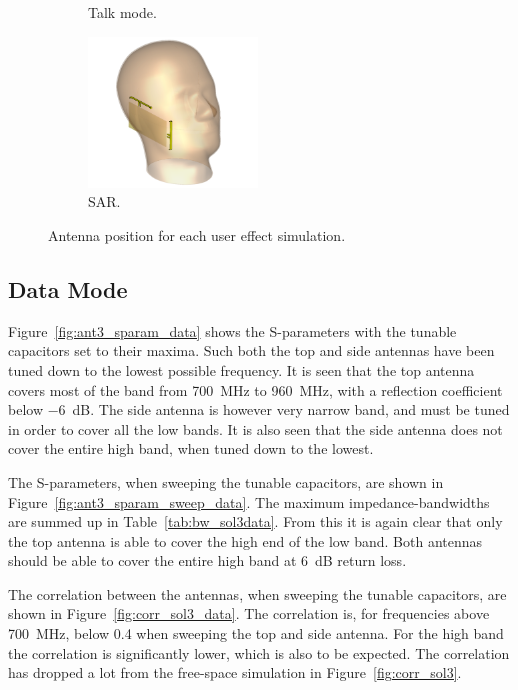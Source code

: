 \begin{figure}[htbp]
\begin{subfigure}[b]{0.24\linewidth}
        \caption{Talk mode.}
    \end{subfigure}
    \begin{subfigure}[b]{0.24\linewidth}
        \centering
        \includegraphics[width=\linewidth,height=4cm,keepaspectratio]{img/tech_sol/nonresonant/simulation/sar/3d}
        \caption{SAR.}
    \end{subfigure}
    \caption{Antenna position for each user effect simulation.}
    \label{fig:ant3_positions}
\end{figure}

\FloatBarrier
\subsection{Data Mode}
Figure~\ref{fig:ant3_sparam_data} shows the S-parameters with the tunable capacitors set to their maxima. Such both the top and side antennas have been tuned down to the lowest possible frequency. It is seen that the top antenna covers most of the band from \SI{700}{MHz} to \SI{960}{MHz}, with a reflection coefficient below \SI{-6}{dB}. The side antenna is however very narrow band, and must be tuned in order to cover all the low bands. It is also seen that the side antenna does not cover the entire high band, when tuned down to the lowest. 

The S-parameters, when sweeping the tunable capacitors, are shown in Figure~\ref{fig:ant3_sparam_sweep_data}. The maximum impedance-bandwidths are summed up in Table~\ref{tab:bw_sol3data}. From this it is again clear that only the top antenna is able to cover the high end of the low band. Both antennas should be able to cover the entire high band at \SI{6}{dB} return loss.

The correlation between the antennas, when sweeping the tunable capacitors, are shown in Figure~\ref{fig:corr_sol3_data}. The correlation is, for frequencies above \SI{700}{MHz}, below 0.4 when sweeping the top and side antenna. For the high band the correlation is significantly lower, which is also to be expected. The correlation has dropped a lot from the free-space simulation in Figure~\ref{fig:corr_sol3}.

